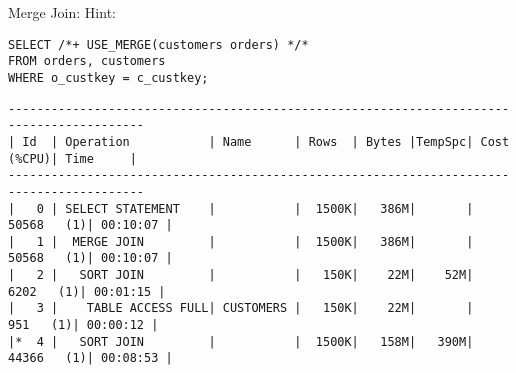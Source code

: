 \documentclass[11pt,a4paper,parskip=half]{scrartcl}
\begin{document}
Merge Join:
Hint:
\begin{lstlisting}
SELECT /*+ USE_MERGE(customers orders) */*
FROM orders, customers
WHERE o_custkey = c_custkey;
\end{lstlisting}
\begin{lstlisting}
-----------------------------------------------------------------------------------------                                                                                                                                                                                                                    
| Id  | Operation           | Name      | Rows  | Bytes |TempSpc| Cost (%CPU)| Time     |                                                                                                                                                                                                                    
-----------------------------------------------------------------------------------------                                                                                                                                                                                                                    
|   0 | SELECT STATEMENT    |           |  1500K|   386M|       | 50568   (1)| 00:10:07 |                                                                                                                                                                                                                    
|   1 |  MERGE JOIN         |           |  1500K|   386M|       | 50568   (1)| 00:10:07 |                                                                                                                                                                                                                    
|   2 |   SORT JOIN         |           |   150K|    22M|    52M|  6202   (1)| 00:01:15 |                                                                                                                                                                                                                    
|   3 |    TABLE ACCESS FULL| CUSTOMERS |   150K|    22M|       |   951   (1)| 00:00:12 |                                                                                                                                                                                                                    
|*  4 |   SORT JOIN         |           |  1500K|   158M|   390M| 44366   (1)| 00:08:53 |                                                                                                                                                                                                                    

\end{lstlisting}
\end{document}
